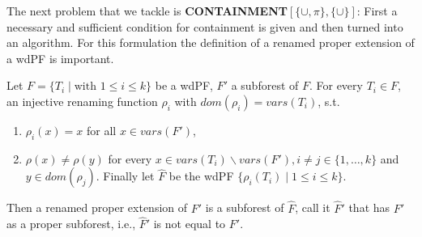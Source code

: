 The next problem that we tackle is \textbf{CONTAINMENT$[\{\cup,\pi\},\{\cup\}]$}: First
a necessary and sufficient condition for containment is given and then turned
into an algorithm. For this formulation the definition of a renamed proper
extension of a wdPF is important.
\begin{definition}
	Let $F = \{ T_i \mid \mbox{with } 1\leq i \leq k\}$ be a wdPF, $F'$ a
	subforest of $F$. For every $T_i \in F$, an injective renaming function
	$\rho_i$ with $dom(\rho_i) = vars(T_i)$, s.t. 
	\begin{enumerate}
		\item $\rho_i(x) = x$ for all $x \in vars(F')$,
		\item $\rho(x) \neq \rho(y)$ for every $x \in vars(T_i) \backslash
			vars(F'),i\neq j \in \{ 1, \dots, k\}$ and $y \in dom(\rho_j)$.
			Finally let $\hat{F}$ be the wdPF $\{ \rho_i(T_i) \mid 1 \leq i \leq
			k\}$. 
	\end{enumerate}
	Then a renamed proper extension of $F'$ is a subforest of
	$\hat{F}$, call it $\hat{F}'$ that has $F'$ as a proper subforest, i.e.,
	$\hat{F}'$ is not equal to $F'$.
\end{definition}

